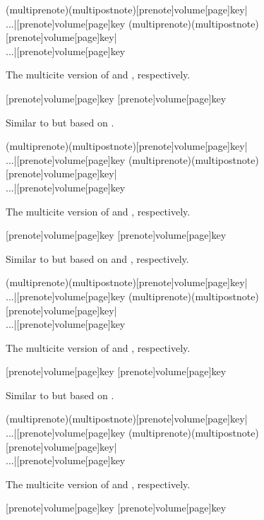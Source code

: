 \begin{ltxsyntax}
(multiprenote)(multipostnote)[prenote]{volume}[page]{key}|\\...|[prenote]{volume}[page]{key}
(multiprenote)(multipostnote)[prenote]{volume}[page]{key}|\\...|[prenote]{volume}[page]{key}

The multicite version of  and , respectively.

[prenote]{volume}[page]{key}
[prenote]{volume}[page]{key}

Similar to  but based on .

(multiprenote)(multipostnote)[prenote]{volume}[page]{key}|\\...|[prenote]{volume}[page]{key}
(multiprenote)(multipostnote)[prenote]{volume}[page]{key}|\\...|[prenote]{volume}[page]{key}

The multicite version of  and , respectively.

[prenote]{volume}[page]{key}
[prenote]{volume}[page]{key}

Similar to  but based on  and , respectively.

(multiprenote)(multipostnote)[prenote]{volume}[page]{key}|\\...|[prenote]{volume}[page]{key}
(multiprenote)(multipostnote)[prenote]{volume}[page]{key}|\\...|[prenote]{volume}[page]{key}

The multicite version of  and , respectively.

[prenote]{volume}[page]{key}
[prenote]{volume}[page]{key}

Similar to  but based on .

(multiprenote)(multipostnote)[prenote]{volume}[page]{key}|\\...|[prenote]{volume}[page]{key}
(multiprenote)(multipostnote)[prenote]{volume}[page]{key}|\\...|[prenote]{volume}[page]{key}

The multicite version of  and , respectively.

[prenote]{volume}[page]{key}
[prenote]{volume}[page]{key}


\end{ltxsyntax}
